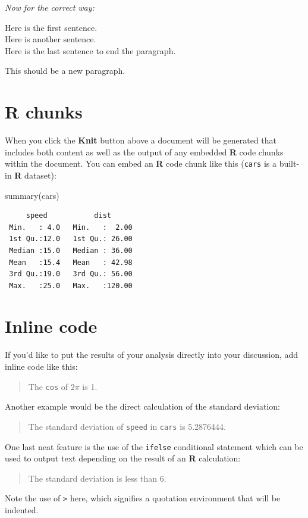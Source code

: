 \documentclass[12pt,oneside]{tisemthesis}
\newenvironment{Shaded}{\begin{snugshade}}{\end{snugshade}}
\newcommand{\FunctionTok}[1]{\textcolor[rgb]{0.00,0.00,0.00}{#1}}
\newcommand{\NormalTok}[1]{#1}
\begin{document}
\emph{Now for the correct way:}

Here is the first sentence.\\
Here is another sentence.\\
Here is the last sentence to end the paragraph.

This should be a new paragraph.

\hypertarget{r-chunks}{%
\section{R chunks}\label{r-chunks}}

When you click the \textbf{Knit} button above a document will be generated that includes both content as well as the output of any embedded \textbf{R} code chunks within the document.
You can embed an \textbf{R} code chunk like this (\texttt{cars} is a built-in \textbf{R} dataset):
\begin{Shaded}
\begin{Highlighting}[]
\FunctionTok{summary}\NormalTok{(cars)}
\end{Highlighting}
\end{Shaded}
\begin{verbatim}
     speed           dist       
 Min.   : 4.0   Min.   :  2.00  
 1st Qu.:12.0   1st Qu.: 26.00  
 Median :15.0   Median : 36.00  
 Mean   :15.4   Mean   : 42.98  
 3rd Qu.:19.0   3rd Qu.: 56.00  
 Max.   :25.0   Max.   :120.00  
\end{verbatim}
\hypertarget{inline-code}{%
\section{Inline code}\label{inline-code}}

If you'd like to put the results of your analysis directly into your discussion, add inline code like this:
\begin{quote}
The \texttt{cos} of \(2 \pi\) is 1.
\end{quote}
Another example would be the direct calculation of the standard deviation:
\begin{quote}
The standard deviation of \texttt{speed} in \texttt{cars} is 5.2876444.
\end{quote}
One last neat feature is the use of the \texttt{ifelse} conditional statement which can be used to output text depending on the result of an \textbf{R} calculation:
\begin{quote}
The standard deviation is less than 6.
\end{quote}
Note the use of \texttt{\textgreater{}} here, which signifies a quotation environment that will be indented.
\end{document}
